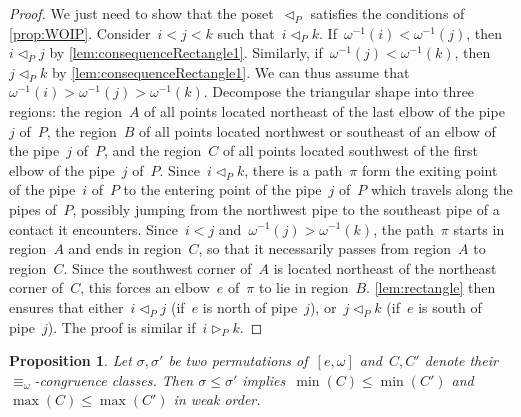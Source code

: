 \documentclass{amsart}
\newtheorem{proposition}[theorem]{Proposition}
\theoremstyle{definition}
\newcommand{\less}{\vartriangleleft} %
\newcommand{\more}{\vartriangleright} %
\newcommand{\contactLess}[1]{\less_{#1}} %
\newcommand{\contactMore}[1]{\more_{#1}} %
\begin{document}
\begin{proof}
We just need to show that the poset~$\contactLess{P}$ satisfies the conditions of \cref{prop:WOIP}.
Consider~$i < j < k$ such that~$i \contactLess{P} k$.
If~$\omega^{-1}(i) < \omega^{-1}(j)$, then~$i \contactLess{P} j$ by \cref{lem:consequenceRectangle1}.
Similarly, if~$\omega^{-1}(j) < \omega^{-1}(k)$, then~$j \contactLess{P} k$ by \cref{lem:consequenceRectangle1}.
We can thus assume that~${\omega^{-1}(i) > \omega^{-1}(j) > \omega^{-1}(k)}$.
Decompose the triangular shape into three regions: the region~$A$ of all points located northeast of the last elbow of the pipe~$j$ of~$P$, the region~$B$ of all points located northwest or southeast of an elbow of the pipe~$j$ of~$P$, and the region~$C$ of all points located southwest of the first elbow of the pipe~$j$ of~$P$.
Since~$i \contactLess{P} k$, there is a path~$\pi$ form the exiting point of the pipe~$i$ of~$P$ to the entering point of the pipe~$j$ of~$P$ which travels along the pipes of~$P$, possibly jumping from the northwest pipe to the southeast pipe of a contact it encounters.
Since~$i < j$ and~$\omega^{-1}(j) > \omega^{-1}(k)$, the path~$\pi$ starts in region~$A$ and ends in region~$C$, so that it necessarily passes from region~$A$ to region~$C$.
Since the southwest corner of~$A$ is located northeast of the northeast corner of~$C$, this forces an elbow~$e$ of~$\pi$ to lie in region~$B$.
\cref{lem:rectangle} then ensures that either~$i \contactLess{P} j$ (if~$e$ is north of pipe~$j$), or~$j \contactLess{P} k$ (if~$e$ is south of pipe~$j$).
The proof is similar if~$i \contactMore{P} k$.
\end{proof}

\begin{proposition}
\label{prop:orderPreserving}
Let $\sigma, \sigma'$ be two permutations of~$[e, \omega]$ and~$C, C'$ denote their $\equiv_\omega$-congruence classes.
Then $\sigma \le \sigma'$ implies~$\min(C) \le \min(C')$ and $\max(C) \le \max(C')$ in weak order.
\end{proposition}
\end{document}
